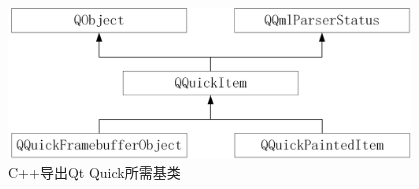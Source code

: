 \begin{figure}[htb] %
\marginnote{\fbox{\scriptsize{\kaishu\figurename\,}\footnotesize{\ref{p000010}}}}\centering %
\includegraphics[width=0.95\textwidth]{chapter01/images/qtquick_item.png} %
\caption{C{\sourcefonttwo{}+}{\sourcefonttwo{}+}导出Qt Quick所需基类} %
\label{p000010} %
\end{figure}










